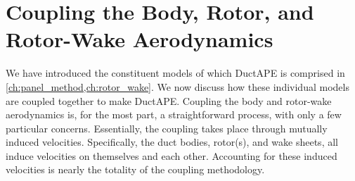 

\section{Coupling the Body, Rotor, and Rotor-Wake Aerodynamics}

We have introduced the constituent models of which DuctAPE is comprised in \cref{ch:panel_method,ch:rotor_wake}.
%
We now discuss how these individual models are coupled together to make DuctAPE.
%
Coupling the body and rotor-wake aerodynamics is, for the most part, a straightforward process, with only a few particular concerns.
%
Essentially, the coupling takes place through mutually induced velocities.
%
Specifically, the duct bodies, rotor(s), and wake sheets, all induce velocities on themselves and each other.
%
Accounting for these induced velocities is nearly the totality of the coupling methodology.


